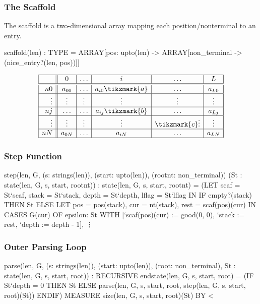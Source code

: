 \documentclass[xcolor=dvipsnames]{beamer}
\begin{document}
\begin{frame}[fragile]
\frametitle{The Scaffold}
The scaffold is a two-dimensional array mapping each position/nonterminal to an entry.
\begin{smallersession}
scaffold(len) : TYPE
= ARRAY[pos: upto(len) ->
    ARRAY[non_terminal -> (nice_entry?(len, pos))]]  
\end{smallersession}
$$
\begin{array}{|r||c|c|c|c|c|}\hline
  & 0 & \ldots & i & \ldots & L \\\hline\hline
  n0 & a_{00}& \ldots & a_{i0}\tikzmark{a} & \ldots & a_{L0}\\\hline
  \vdots & \vdots & \vdots & \vdots & \vdots & \vdots\\\hline
  nj & \ldots & \ldots & a_{ij}\tikzmark{b} & \ldots & a_{Lj}\\\hline
  \vdots & \vdots & \vdots & \vdots & \tikzmark{c}\vdots & \vdots\\\hline  
  nN & a_{0N}& \ldots & a_{iN} & \ldots & a_{LN}\\\hline
\end{array}
$$

\end{frame}


\begin{frame}[fragile]
\frametitle{Step Function}
  \begin{smallersession}
step(len, G, (s: strings(len)), (start: upto(len)),
     (rootnt: non_terminal))
    (St : state(len, G, s, start, rootnt))
    : state(len, G, s, start, rootnt)
 = (LET scaf = St`scaf,
	stack = St`stack,
	depth = St`depth,
	lflag = St`lflag
     IN
    IF empty?(stack)
    THEN St
    ELSE LET pos = pos(stack),
             cur = nt(stack),
	     rest = scaf(pos)(cur)
	  IN CASES G(cur) OF
          epsilon: St WITH [`scaf(pos)(cur) := good(0, 0),
                            `stack := rest,
                            `depth := depth - 1],
    \vdots
  \end{smallersession}

\end{frame}


\begin{frame}[fragile]
\frametitle{Outer Parsing Loop}
  \begin{smallersession}
    parse(len, G, (s: strings(len)), (start: upto(len)),
           (root: non_terminal), St : state(len, G, s, start, root))
    : RECURSIVE endstate(len, G, s, start, root)
  = (IF St`depth = 0
      THEN St
      ELSE parse(len, G, s, start, root,
                 step(len, G, s, start, root)(St))
      ENDIF)
      MEASURE size(len, G, s, start, root)(St) BY <
    \end{smallersession}

\end{frame}
\end{document}
